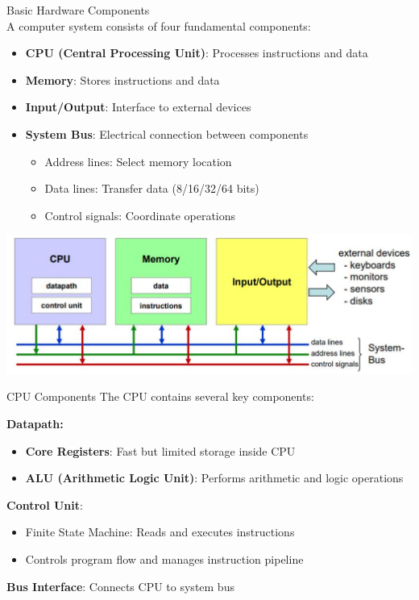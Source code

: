 \begin{definition}{Basic Hardware Components}\\
A computer system consists of four fundamental components:
\begin{itemize}
  \item \textcolor{cornflower}{\textbf{CPU (Central Processing Unit)}}: Processes instructions and data
  \item \textcolor{frog}{\textbf{Memory}}: Stores instructions and data
  \item \textcolor{corn}{\textbf{Input/Output}}: Interface to external devices
  \item \textbf{System Bus}: Electrical connection between components 
    \begin{itemize}
      \item Address lines: Select memory location
      \item Data lines: Transfer data (8/16/32/64 bits)
      \item Control signals: Coordinate operations
    \end{itemize}
\end{itemize}

\includegraphics[width=\linewidth]{images/2024_12_29_79e6b22f503fb7b4f718g-01(1)}
\end{definition}

\begin{examplecode}{CPU Components}
The CPU contains several key components:

\textcolor{cornflower}{\textbf{Datapath:}}
\begin{itemize}
  \item \textbf{Core Registers}: Fast but limited storage inside CPU
  \item \textbf{ALU (Arithmetic Logic Unit)}: Performs arithmetic and logic operations
  \end{itemize}
\textcolor{cornflower}{\textbf{Control Unit}}: 
    \begin{itemize}
      \item Finite State Machine: Reads and executes instructions
      \item Controls program flow and manages instruction pipeline
    \end{itemize}
  \textcolor{cornflower}{\textbf{Bus Interface}}: Connects CPU to system bus
\end{examplecode}

